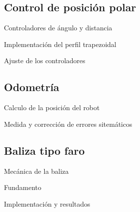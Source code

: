 \documentclass{beamer}
\begin{document}
\subsection{Control de posición polar}

\begin{frame}{Controladores de ángulo y distancia}
\end{frame}

\begin{frame}{Implementación del perfil trapezoidal}
\end{frame}

\begin{frame}{Ajuste de los controladores}
\end{frame}

\subsection{Odometría}

\begin{frame}{Calculo de la posición del robot}
\end{frame}

\begin{frame}{Medida y corrección de errores sitemáticos}
\end{frame}


\subsection{Baliza tipo faro}

\begin{frame}{Mecánica de la baliza}
\begin{center}
\end{center}
\end{frame}

\begin{frame}{Fundamento}
\begin{center}
\end{center}

\end{frame}

\begin{frame}{Implementación y resultados}
\begin{center}
\end{center}
\end{frame}
\end{document}

